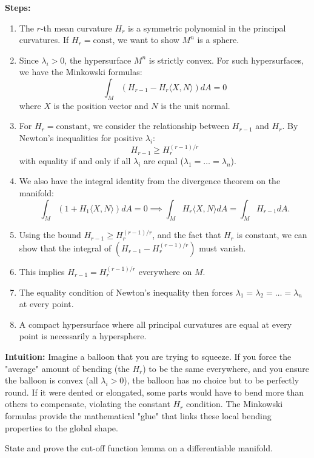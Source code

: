 \begin{solution}
\textbf{Steps:}
\begin{enumerate}
    \item The $r$-th mean curvature $H_r$ is a symmetric polynomial in the principal curvatures. If $H_r = \text{const}$, we want to show $M^n$ is a sphere.
    \item Since $\lambda_i > 0$, the hypersurface $M^n$ is strictly convex. For such hypersurfaces, we have the Minkowski formulas:
    \[ \int_M (H_{r-1} - H_r \langle X, N \rangle) dA = 0 \]
    where $X$ is the position vector and $N$ is the unit normal.
    \item For $H_r = \text{constant}$, we consider the relationship between $H_{r-1}$ and $H_r$. By Newton's inequalities for positive $\lambda_i$:
    \[ H_{r-1} \ge H_r^{(r-1)/r} \]
    with equality if and only if all $\lambda_i$ are equal ($\lambda_1 = \dots = \lambda_n$).
    \item We also have the integral identity from the divergence theorem on the manifold:
    \[ \int_M (1 + H_1 \langle X, N \rangle) dA = 0 \implies \int_M H_r \langle X, N \rangle dA = \int_M H_{r-1} dA. \]
    \item Using the bound $H_{r-1} \ge H_r^{(r-1)/r}$, and the fact that $H_r$ is constant, we can show that the integral of $(H_{r-1} - H_r^{(r-1)/r})$ must vanish.
    \item This implies $H_{r-1} = H_r^{(r-1)/r}$ everywhere on $M$.
    \item The equality condition of Newton's inequality then forces $\lambda_1 = \lambda_2 = \dots = \lambda_n$ at every point.
    \item A compact hypersurface where all principal curvatures are equal at every point is necessarily a hypersphere.
\end{enumerate}

\textbf{Intuition:}
Imagine a balloon that you are trying to squeeze. If you force the "average" amount of bending (the $H_r$) to be the same everywhere, and you ensure the balloon is convex (all $\lambda_i > 0$), the balloon has no choice but to be perfectly round. If it were dented or elongated, some parts would have to bend more than others to compensate, violating the constant $H_r$ condition. The Minkowski formulas provide the mathematical "glue" that links these local bending properties to the global shape.
\end{solution}

\begin{exercise}
\label{geometry:2016:4}
State and prove the cut-off function lemma on a differentiable manifold.
\end{exercise}

